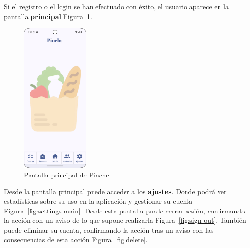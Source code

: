 \clearpage
Si el registro o el login se han efectuado con éxito, el usuario aparece en la pantalla \textbf{principal} Figura~\ref{fig:main}.

\begin{figure}[H]
\centering
\includegraphics[width=0.3\textwidth]{./img/manual/pinche_home.png}
\caption{Pantalla principal de Pinche}
\label{fig:main}
\end{figure}

\clearpage
Desde la pantalla principal puede acceder a los \textbf{ajustes}. Donde podrá ver estadísticas sobre su uso en la aplicación y gestionar su cuenta Figura~\ref{fig:settings-main}. Desde esta pantalla puede cerrar sesión, confirmando la acción con un aviso de lo que supone realizarla Figura~\ref{fig:sign-out}. También puede eliminar su cuenta, confirmando la acción tras un aviso con las consecuencias de esta acción Figura~\ref{fig:delete}.

